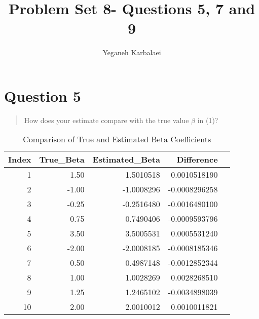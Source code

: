 \documentclass{article}
\title{Problem Set 8- Questions 5, 7 and 9}
\author{Yeganeh Karbalaei}
\date{}
\begin{document}
\maketitle

\section{Question 5}
\begin{quote}
\selectfont %
 How does your estimate compare with the
true value $\beta$ in (1)?
\end{quote}
\begin{table}[htbp]
\centering
\caption{Comparison of True and Estimated Beta Coefficients}
\begin{tabular}{rrrrr}
\hline
\textbf{Index} & \textbf{True\_Beta} & \textbf{Estimated\_Beta} & \textbf{Difference} \\
\hline
1 & 1.50 & 1.5010518 & 0.0010518190 \\
2 & -1.00 & -1.0008296 & -0.0008296258 \\
3 & -0.25 & -0.2516480 & -0.0016480100 \\
4 & 0.75 & 0.7490406 & -0.0009593796 \\
5 & 3.50 & 3.5005531 & 0.0005531240 \\
6 & -2.00 & -2.0008185 & -0.0008185346 \\
7 & 0.50 & 0.4987148 & -0.0012852344 \\
8 & 1.00 & 1.0028269 & 0.0028268510 \\
9 & 1.25 & 1.2465102 & -0.0034898039 \\
10 & 2.00 & 2.0010012 & 0.0010011821 \\
\hline
\end{tabular}
\label{tab:beta_comparison}
\end{table}
\end{document}
